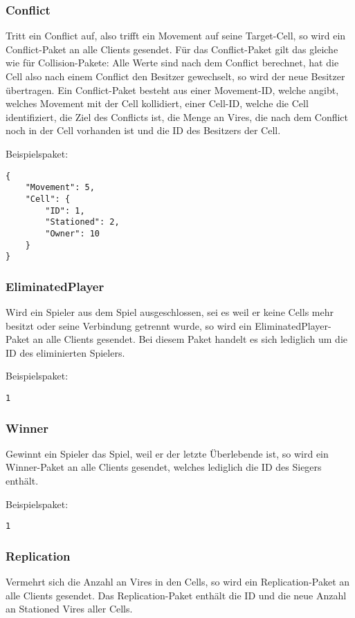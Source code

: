 \subsubsection{Conflict}
Tritt ein Conflict auf, also trifft ein Movement auf seine Target-Cell, so wird ein Conflict-Paket an alle Clients gesendet. Für das Conflict-Paket gilt das gleiche wie für Collision-Pakete: Alle Werte sind nach dem Conflict berechnet, hat die Cell also nach einem Conflict den Besitzer gewechselt, so wird der neue Besitzer übertragen.
Ein Conflict-Paket besteht aus einer Movement-ID, welche angibt, welches Movement mit der Cell kollidiert, einer Cell-ID, welche die Cell identifiziert, die Ziel des Conflicts ist, die Menge an Vires, die nach dem Conflict noch in der Cell vorhanden ist und die ID des Besitzers der Cell.

Beispielspaket:
\begin{lstlisting}
{
    "Movement": 5,
    "Cell": {
        "ID": 1,
        "Stationed": 2,
        "Owner": 10
    }
}
\end{lstlisting}

\subsubsection{EliminatedPlayer}
Wird ein Spieler aus dem Spiel ausgeschlossen, sei es weil er keine Cells mehr besitzt oder seine Verbindung getrennt wurde, so wird ein EliminatedPlayer-Paket an alle Clients gesendet. Bei diesem Paket handelt es sich lediglich um die ID des eliminierten Spielers.

Beispielspaket:
\begin{lstlisting}
1
\end{lstlisting}

\subsubsection{Winner}
Gewinnt ein Spieler das Spiel, weil er der letzte Überlebende ist, so wird ein Winner-Paket an alle Clients gesendet, welches lediglich die ID des Siegers enthält.

Beispielspaket:
\begin{lstlisting}
1
\end{lstlisting}

\subsubsection{Replication}
Vermehrt sich die Anzahl an Vires in den Cells, so wird ein Replication-Paket an alle Clients gesendet. Das Replication-Paket enthält die ID und die neue Anzahl an Stationed Vires aller Cells.

